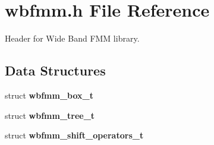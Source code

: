 \section{wbfmm.\+h File Reference}
\label{wbfmm_8h}


Header for Wide Band F\+MM library.  


\subsection*{Data Structures}
\begin{DoxyCompactItemize}
\item 
struct \textbf{ wbfmm\+\_\+box\+\_\+t}
\item 
struct \textbf{ wbfmm\+\_\+tree\+\_\+t}
\item 
struct \textbf{ wbfmm\+\_\+shift\+\_\+operators\+\_\+t}
\end{DoxyCompactItemize}
